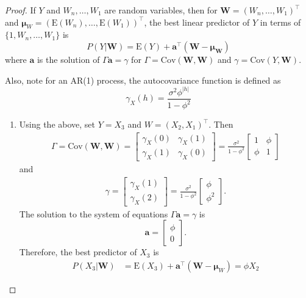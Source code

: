 \documentclass[12pt]{article}
\theoremstyle{definition}
\newcommand{\E}{\text{E}}
\newcommand{\Co}[2]{\text{Cov}\left({#1}, {#2}\right)}
\newcommand{\vect}[1]{\boldsymbol{#1}}
\begin{document}
\begin{proof}
  If $Y$ and $W_n, \dots, W_1$ are random variables, then for $\vect{W} = (W_n, \dots, W_1)^\intercal$
  and $\vect{\mu}_W= \left(\E(W_n), \dots, \E(W_1)\right)^\intercal$, the best linear
  predictor of $Y$ in terms of $\{1, W_n, \dots, W_1\}$ is
  \[
    P(Y|\vect{W}) = \E(Y) + \vect{a}^\intercal (\vect{W} - \vect{\mu_W})
  \]
  where $\vect{a}$ is the solution of $\Gamma \vect{a} = \gamma$ for
  $\Gamma = \Co{\vect{W}}{\vect{W}}$ and $\gamma = \Co{Y}{\vect{W}}$.

  Also, note for an AR(1) process, the autocovariance function is defined as
  \[
    \gamma_X(h) = \frac{\sigma^2\phi^{|h|}}{1-\phi^2}
  \]
  \begin{enumerate}
    \item Using the above, set $Y = X_3$ and $W = (X_2, X_1)^\intercal$. Then
      \begin{align*}
        \Gamma = \Co{\vect{W}}{\vect{W}} =
        \begin{bmatrix} \gamma_X(0) & \gamma_X(1) \\ \gamma_X(1) & \gamma_X(0) \end{bmatrix} =
        \frac{\sigma^2}{1-\phi^2} \begin{bmatrix} 1  & \phi \\ \phi & 1 \end{bmatrix}
      \end{align*}
      and
      \begin{align*}
        \gamma = \begin{bmatrix} \gamma_X(1) \\ \gamma_X(2) \end{bmatrix}
        = \frac{\sigma^2}{1-\phi^2} \begin{bmatrix} \phi \\ \phi^2 \end{bmatrix}.
      \end{align*}
      The solution to the system of equations $\Gamma \vect{a} = \gamma$ is
      $$\vect{a} = \begin{bmatrix} \phi \\ 0\end{bmatrix}.$$
      Therefore, the best predictor of $X_3$ is
      \begin{align*}
        P(X_3|\vect{W}) &= \E(X_3) + \vect{a}^\intercal (\vect{W} - \vect{\mu}_W) = \phi X_2
      \end{align*}


\end{enumerate}
\end{proof}
\end{document}

